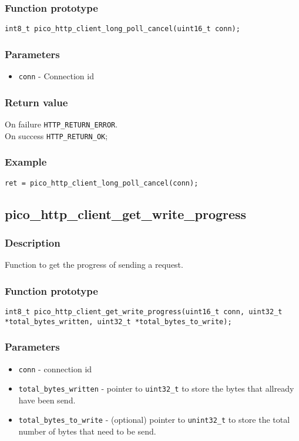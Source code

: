 \subsubsection*{Function prototype}
\texttt{int8\_t pico\_http\_client\_long\_poll\_cancel(uint16\_t conn);}

\subsubsection*{Parameters}
\begin{itemize}[noitemsep]
\item \texttt{conn} - Connection id
\end{itemize}
\subsubsection*{Return value}
On failure \texttt{HTTP\_RETURN\_ERROR}.
\\On success \texttt{HTTP\_RETURN\_OK};
\subsubsection*{Example}
\begin{verbatim}
ret = pico_http_client_long_poll_cancel(conn);
\end{verbatim}


\subsection{pico\_http\_client\_get\_write\_progress}

\subsubsection*{Description}
Function to get the progress of sending a request.

\subsubsection*{Function prototype}
\texttt{int8\_t pico\_http\_client\_get\_write\_progress(uint16\_t conn, uint32\_t *total\_bytes\_written, uint32\_t *total\_bytes\_to\_write);}

\subsubsection*{Parameters}
\begin{itemize}[noitemsep]
\item \texttt{conn} - connection id
\item \texttt{total\_bytes\_written} - pointer to \texttt{uint32\_t} to store the bytes that allready have been send.
\item \texttt{total\_bytes\_to\_write} - (optional) pointer to  \texttt{unint32\_t} to store the total number of bytes that need to be send.
\end{itemize}
